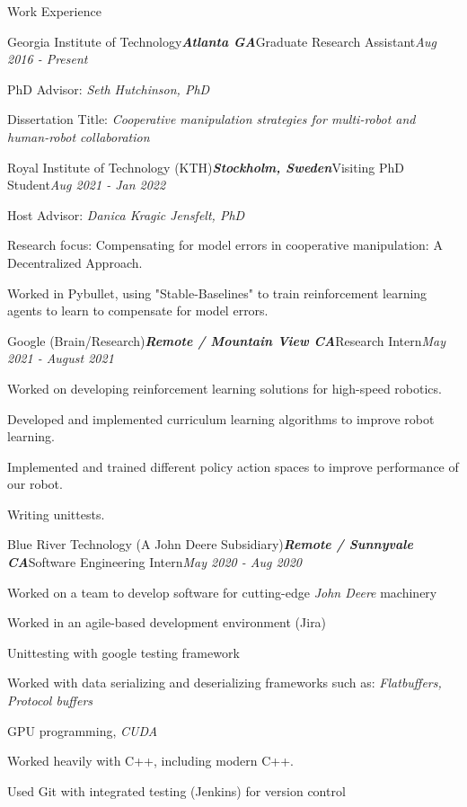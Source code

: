 \documentclass{resume} %
\begin{document}
\begin{rSection}{Work Experience}
\begin{rSubsection}{Georgia Institute of Technology}{\bf \em Atlanta GA}{Graduate Research Assistant}{\em Aug 2016 - Present}
\item PhD Advisor: {\em Seth Hutchinson, PhD}
\item Dissertation Title: {\em Cooperative manipulation strategies for multi-robot and human-robot collaboration}
\end{rSubsection}

\begin{rSubsection}{Royal Institute of Technology (KTH)}{\bf \em Stockholm, Sweden}{Visiting PhD Student}{\em Aug 2021 - Jan 2022}
\item Host Advisor: {\em Danica Kragic Jensfelt, PhD}
\item Research focus: Compensating for model errors in cooperative manipulation: A Decentralized Approach.
\item Worked in Pybullet, using "Stable-Baselines" to train reinforcement learning agents to learn to compensate for model errors.
\end{rSubsection}

\begin{rSubsection}{Google (Brain/Research)}{\bf \em Remote / Mountain View CA}{Research Intern}{\em May 2021 - August 2021}
\item Worked on developing reinforcement learning solutions for high-speed robotics.
\item Developed and implemented curriculum learning algorithms to improve robot learning.
\item Implemented and trained different policy action spaces to improve performance of our robot.
\item Writing unittests.
\end{rSubsection}

\begin{rSubsection}{Blue River Technology (A John Deere Subsidiary)}{\bf \em Remote / Sunnyvale CA}{Software Engineering Intern}{\em May 2020 - Aug 2020}
\item Worked on a team to develop software for cutting-edge {\em John Deere} machinery
\item Worked in an agile-based development environment (Jira)
\item Unittesting with google testing framework
\item Worked with data serializing and deserializing frameworks such as: {\em Flatbuffers, Protocol buffers}
\item GPU programming, {\em CUDA}
\item Worked heavily with C++, including modern C++. 
\item Used Git with integrated testing (Jenkins) for version control
\end{rSubsection}


\end{rSection}
\end{document}
